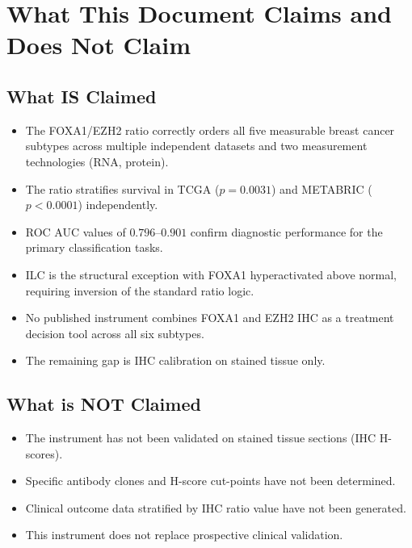 \documentclass[12pt, a4paper]{article}
\begin{document}
\section{What This Document Claims and Does
Not Claim}

\subsection{What IS Claimed}

\begin{itemize}
    \item The FOXA1/EZH2 ratio correctly orders
    all five measurable breast cancer subtypes
    across multiple independent datasets and two
    measurement technologies (RNA, protein).
    \item The ratio stratifies survival in TCGA
    ($p=0.0031$) and METABRIC ($p<0.0001$)
    independently.
    \item ROC AUC values of $0.796$--$0.901$
    confirm diagnostic performance for the
    primary classification tasks.
    \item ILC is the structural exception with
    FOXA1 hyperactivated above normal, requiring
    inversion of the standard ratio logic.
    \item No published instrument combines FOXA1
    and EZH2 IHC as a treatment decision tool
    across all six subtypes.
    \item The remaining gap is IHC calibration
    on stained tissue only.
\end{itemize}

\subsection{What is NOT Claimed}

\begin{itemize}
    \item The instrument has not been validated
    on stained tissue sections (IHC H-scores).
    \item Specific antibody clones and H-score
    cut-points have not been determined.
    \item Clinical outcome data stratified by
    IHC ratio value have not been generated.
    \item This instrument does not replace
    prospective clinical validation.
\end{itemize}
\end{document}
